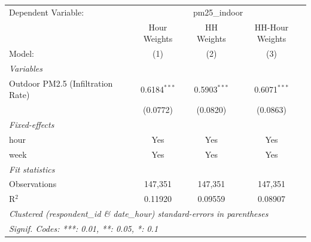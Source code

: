 
\begingroup
\centering
\begin{tabular}{lccc}
   \tabularnewline \midrule \midrule
   Dependent Variable: & \multicolumn{3}{c}{pm25\_indoor}\\
                                     & Hour Weights   & HH Weights     & HH-Hour Weights \\   
   Model:                            & (1)            & (2)            & (3)\\  
   \midrule
   \emph{Variables}\\
   Outdoor PM2.5 (Infiltration Rate) & 0.6184$^{***}$ & 0.5903$^{***}$ & 0.6071$^{***}$\\   
                                     & (0.0772)       & (0.0820)       & (0.0863)\\   
   \midrule
   \emph{Fixed-effects}\\
   hour                              & Yes            & Yes            & Yes\\  
   week                              & Yes            & Yes            & Yes\\  
   \midrule
   \emph{Fit statistics}\\
   Observations                      & 147,351        & 147,351        & 147,351\\  
   R$^2$                             & 0.11920        & 0.09559        & 0.08907\\  
   \midrule \midrule
   \multicolumn{4}{l}{\emph{Clustered (respondent\_id \& date\_hour) standard-errors in parentheses}}\\
   \multicolumn{4}{l}{\emph{Signif. Codes: ***: 0.01, **: 0.05, *: 0.1}}\\
\end{tabular}
\par\endgroup


